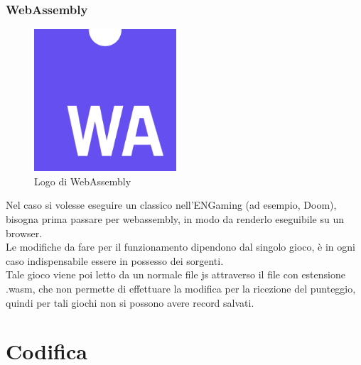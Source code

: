\subsubsection{WebAssembly}
\begin{figure}[h]
    \centering
    \includegraphics[width=150pt]{images/technologies/webassembly.png}
    \caption{Logo di WebAssembly}
    \label{fig:webassembly}
\end{figure}
Nel caso si volesse eseguire un classico nell'ENGaming (ad esempio, Doom), bisogna prima passare per \gls{webassembly}, in modo da renderlo eseguibile su un browser.\\
Le modifiche da fare per il funzionamento dipendono dal singolo gioco, è in ogni caso indispensabile essere in possesso dei sorgenti.\\
Tale gioco viene poi letto da un normale file \gls{js} attraverso il file con estensione .wasm, che non permette di effettuare la modifica per la ricezione del punteggio, quindi per tali giochi non si possono avere record salvati.


\section{Codifica}
